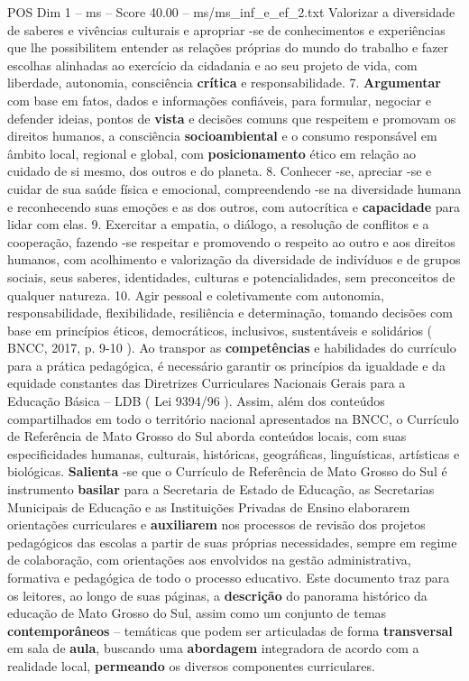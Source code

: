 \begin{textsample}{POS Dim 1 – ms – Score 40.00 – ms/ms\_inf\_e\_ef\_2.txt}
Valorizar a diversidade de saberes e vivências culturais e apropriar -se de conhecimentos e experiências que lhe possibilitem entender as relações próprias do mundo do trabalho e fazer escolhas alinhadas ao exercício da cidadania e ao seu projeto de vida, com liberdade, autonomia, consciência \textbf{crítica} e responsabilidade. 7. \textbf{Argumentar} com base em fatos, dados e informações confiáveis, para formular, negociar e defender ideias, pontos de \textbf{vista} e decisões comuns que respeitem e promovam os direitos humanos, a consciência \textbf{socioambiental} e o consumo responsável em âmbito local, regional e global, com \textbf{posicionamento} ético em relação ao cuidado de si mesmo, dos outros e do planeta. 8.
Conhecer -se, apreciar -se e cuidar de sua saúde física e emocional, compreendendo -se na diversidade humana e reconhecendo suas emoções e as dos outros, com autocrítica e \textbf{capacidade} para lidar com elas. 9.
Exercitar a empatia, o diálogo, a resolução de conflitos e a cooperação, fazendo -se respeitar e promovendo o respeito ao outro e aos direitos humanos, com acolhimento e valorização da diversidade de indivíduos e de grupos sociais, seus saberes, identidades, culturas e potencialidades, sem preconceitos de qualquer natureza. 10.
Agir pessoal e coletivamente com autonomia, responsabilidade, flexibilidade, resiliência e determinação, tomando decisões com base em princípios éticos, democráticos, inclusivos, sustentáveis e solidários ( BNCC, 2017, p. 9-10 ).
Ao transpor as \textbf{competências} e habilidades do currículo para a prática pedagógica, é necessário garantir os princípios da igualdade e da equidade constantes das Diretrizes Curriculares Nacionais Gerais para a Educação Básica – LDB ( Lei 9394/96 ).
Assim, além dos conteúdos compartilhados em todo o território nacional apresentados na BNCC, o Currículo de Referência de Mato Grosso do Sul aborda conteúdos locais, com suas especificidades humanas, culturais, históricas, geográficas, linguísticas, artísticas e biológicas. \textbf{Salienta} -se que o Currículo de Referência de Mato Grosso do Sul é instrumento \textbf{basilar} para a Secretaria de Estado de Educação, as Secretarias Municipais de Educação e as Instituições Privadas de Ensino elaborarem orientações curriculares e \textbf{auxiliarem} nos processos de revisão dos projetos pedagógicos das escolas a partir de suas próprias necessidades, sempre em regime de colaboração, com orientações aos envolvidos na gestão administrativa, formativa e pedagógica de todo o processo educativo.
Este documento traz para os leitores, ao longo de suas páginas, a \textbf{descrição} do panorama histórico da educação de Mato Grosso do Sul, assim como um conjunto de temas \textbf{contemporâneos} – temáticas que podem ser articuladas de forma \textbf{transversal} em sala de \textbf{aula}, buscando uma \textbf{abordagem} integradora de acordo com a realidade local, \textbf{permeando} os diversos componentes curriculares.

\end{textsample}
